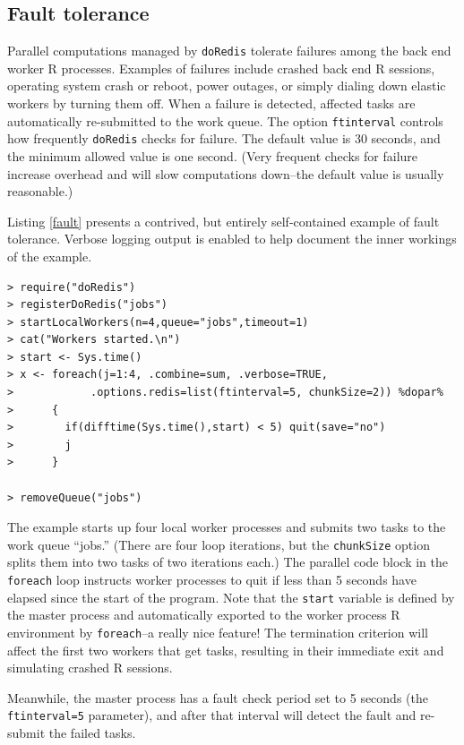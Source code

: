 \documentclass[12pt]{article}
\begin{document}
\subsection{Fault tolerance}

Parallel computations managed by {\tt doRedis} tolerate failures among the back
end worker R processes. Examples of failures include crashed back end R
sessions, operating system crash or reboot, power outages, or simply dialing
down elastic workers by turning them off. When a failure is detected, affected tasks are
automatically re-submitted to the work queue. The option {\tt ftinterval}
controls how frequently {\tt doRedis} checks for failure. The default value is
30 seconds, and the minimum allowed value is one second. (Very frequent checks
for failure increase overhead and will slow computations down--the default
value is usually reasonable.)

Listing \ref{fault} presents a contrived, but entirely self-contained
example of fault tolerance. Verbose logging output is enabled to help document
the inner workings of the example.
\begin{lstlisting}[float=ht,caption=Fault Tolerance Example,label=fault]
> require("doRedis")
> registerDoRedis("jobs")
> startLocalWorkers(n=4,queue="jobs",timeout=1)
> cat("Workers started.\n")
> start <- Sys.time()
> x <- foreach(j=1:4, .combine=sum, .verbose=TRUE,
>            .options.redis=list(ftinterval=5, chunkSize=2)) %dopar%
>      {
>        if(difftime(Sys.time(),start) < 5) quit(save="no")
>        j
>      }

> removeQueue("jobs")
\end{lstlisting}

The example starts up four local worker processes and submits two tasks to the
work queue ``jobs.'' (There are four loop iterations, but the \verb+chunkSize+
option splits them into two tasks of two iterations each.) The parallel code
block in the {\tt foreach} loop instructs worker processes to quit if less than
5 seconds have elapsed since the start of the program. Note that the
\verb+start+ variable is defined by the master process and automatically
exported to the worker process R environment by \verb+foreach+--a really nice
feature! The  termination criterion will affect the first two workers that get
tasks, resulting in their immediate exit and simulating crashed R sessions.

Meanwhile, the master process has a fault check period set to 5 seconds
(the {\tt ftinterval=5} parameter), and after that interval will detect
the fault and re-submit the failed tasks.
\end{document}
